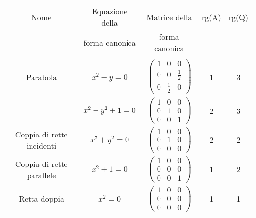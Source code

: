  \begin{tabular}{|c|c|c|c|c|}
 \hline
  Nome & Equazione della & Matrice della & rg(A) & rg(Q)\\
   &  forma canonica & forma canonica & & \\
  \hline
  & & & & \\
  Parabola & $x^2-y=0$ & $\left(\begin{smallmatrix} 1 & 0 & 0 \\ 0 & 0 & \frac{1}{2}\\ 0 & \frac{1}{2} & 0 \end{smallmatrix}\right)$ & 1 & 3 \\
  - & $x^2+y^2+1=0$ & $\left(\begin{smallmatrix} 1 & 0 & 0 \\ 0 & 1 & 0 \\ 0 & 0 & 1 \end{smallmatrix}\right)$ & 2 & 3 \\
  Coppia di rette incidenti & $x^2+y^2=0$ & $\left(\begin{smallmatrix} 1 & 0 & 0 \\ 0 & 1 & 0 \\ 0 & 0 & 0 \end{smallmatrix}\right)$ & 2 & 2 \\
  Coppia di rette parallele & $x^2+1=0$ & $\left(\begin{smallmatrix} 1 & 0 & 0 \\ 0 & 0 & 0 \\ 0 & 0 & 1 \end{smallmatrix}\right)$ & 1 & 2 \\
  Retta doppia & $x^2=0$ & $\left(\begin{smallmatrix} 1 & 0 & 0 \\ 0 & 0 & 0 \\ 0 & 0 & 0 \end{smallmatrix}\right)$ & 1 & 1 \\
  \hline
 \end{tabular}
 
